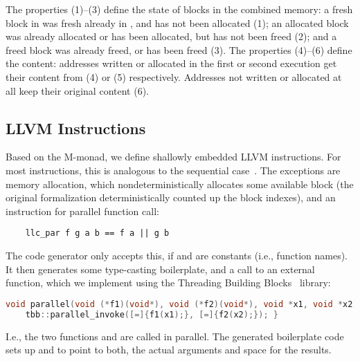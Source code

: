 \documentclass[a4paper,UKenglish,cleveref, autoref, thm-restate]{lipics-v2021}
\begin{document}
  The properties (1)--(3) define the state of blocks in the combined memory:
  a fresh block in  was fresh already in \is{\mu}, and has not been allocated (1);
  an allocated block was already allocated or has been allocated, but has not been freed (2); and a freed block was already freed, or has been freed (3).
  The properties (4)--(6) define the content: addresses written or allocated in the first or second execution get their content from  (4) or  (5) respectively.
  Addresses not written or allocated at all keep their original content (6).




  \subsection{LLVM Instructions}
  Based on the M-monad, we define shallowly embedded LLVM instructions. For most instructions,
  this is analogous to the sequential case~\cite{La19-llvm}.
  The exceptions are memory allocation, which nondeterministically allocates some available
  block (the original formalization deterministically counted up the block indexes), and an instruction for parallel
  function call:
  \begin{lstlisting}
    llc_par f g a b == f a || g b
  \end{lstlisting}
  The code generator only accepts this, if  and  are constants (i.e., function names).
  It then generates some type-casting boilerplate, and a call to an external
   function, which we implement using the Threading Building Blocks~\cite{TBB} library:
  \begin{lstlisting}[language=C++]
  void parallel(void (*f1)(void*), void (*f2)(void*), void *x1, void *x2) {
    tbb::parallel_invoke([=]{f1(x1);}, [=]{f2(x2);}); }
  \end{lstlisting}
  I.e., the two functions  and  are called in parallel. The generated boilerplate code sets up  and  to point to both, the actual arguments and space for the results.
\end{document}
